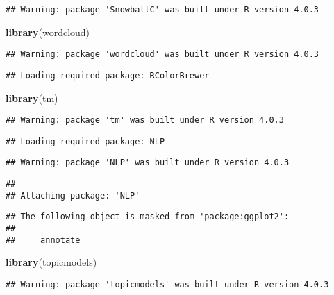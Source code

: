 \documentclass[
]{article}
\newenvironment{Shaded}{\begin{snugshade}}{\end{snugshade}}
\newcommand{\KeywordTok}[1]{\textcolor[rgb]{0.13,0.29,0.53}{\textbf{#1}}}
\newcommand{\NormalTok}[1]{#1}
\begin{document}
\begin{verbatim}
## Warning: package 'SnowballC' was built under R version 4.0.3
\end{verbatim}

\begin{Shaded}
\begin{Highlighting}[]
\KeywordTok{library}\NormalTok{(wordcloud)}
\end{Highlighting}
\end{Shaded}

\begin{verbatim}
## Warning: package 'wordcloud' was built under R version 4.0.3
\end{verbatim}

\begin{verbatim}
## Loading required package: RColorBrewer
\end{verbatim}

\begin{Shaded}
\begin{Highlighting}[]
\KeywordTok{library}\NormalTok{(tm)}
\end{Highlighting}
\end{Shaded}

\begin{verbatim}
## Warning: package 'tm' was built under R version 4.0.3
\end{verbatim}

\begin{verbatim}
## Loading required package: NLP
\end{verbatim}

\begin{verbatim}
## Warning: package 'NLP' was built under R version 4.0.3
\end{verbatim}

\begin{verbatim}
## 
## Attaching package: 'NLP'
\end{verbatim}

\begin{verbatim}
## The following object is masked from 'package:ggplot2':
## 
##     annotate
\end{verbatim}

\begin{Shaded}
\begin{Highlighting}[]
\KeywordTok{library}\NormalTok{(topicmodels)}
\end{Highlighting}
\end{Shaded}

\begin{verbatim}
## Warning: package 'topicmodels' was built under R version 4.0.3
\end{verbatim}
\end{document}
